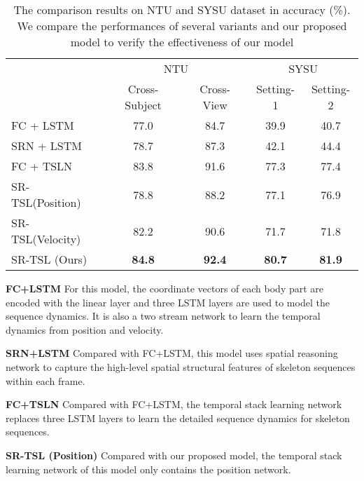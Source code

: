 \documentclass[runningheads]{llncs}
\begin{document}
\setlength{\tabcolsep}{8pt}
\begin{table}[!t]
\fontsize{8pt}{0.85\baselineskip}\selectfont
\begin{center}
\caption{The comparison results on NTU and SYSU dataset in accuracy (\%). We compare the performances of several variants and our proposed model to verify the effectiveness of our model}
\label{baselines_comparison}
\begin{tabular}{l|cc|cc}
    \hline\noalign{\smallskip}
    \multirow{2}{*}{Methods} & \multicolumn{2}{c|}{NTU} & \multicolumn{2}{c}{SYSU} \\
    \cline{2-5}
     &Cross-Subject & Cross-View & Setting-1  & Setting-2\\
    \noalign{\smallskip}
    \hline
    \hline
    \noalign{\smallskip}
    FC + LSTM     & 77.0   & 84.7  & 39.9  & 40.7 \\
    SRN + LSTM    & 78.7 & 87.3    & 42.1  & 44.4 \\
    FC + TSLN      & 83.8 & 91.6   & 77.3  & 77.4 \\
    SR-TSL(Position) & 78.8 & 88.2  & 77.1  & 76.9 \\
    SR-TSL(Velocity) & 82.2 & 90.6  & 71.7  & 71.8 \\
    \hline
    SR-TSL (Ours) & \textbf{84.8} & \textbf{92.4}  & \textbf{80.7}  & \textbf{81.9}\\
    \hline
\end{tabular}
\end{center}
\end{table}

\textbf{FC+LSTM}\hspace{2mm} For this model, the coordinate vectors of each body part are encoded with the linear layer and three LSTM layers are used to model the sequence dynamics. It is also a two stream network to learn the temporal dynamics from position and velocity.

\textbf{SRN+LSTM}\hspace{2mm} Compared with FC+LSTM,  this model uses spatial reasoning network to capture the high-level spatial structural features of skeleton sequences within each frame.

\textbf{FC+TSLN}\hspace{2mm} Compared with FC+LSTM, the temporal stack learning network replaces three LSTM layers to learn the detailed sequence dynamics for skeleton sequences.

\textbf{SR-TSL (Position)}\hspace{2mm} Compared with our proposed model, the temporal stack learning network of this model only contains the position network.
\end{document}
